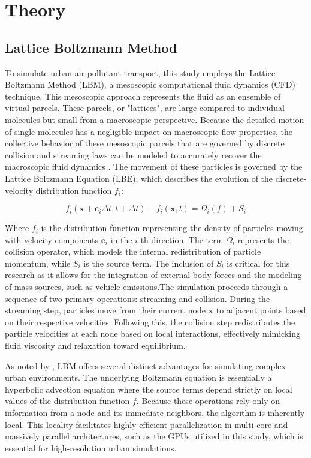 \section{Theory}

\subsection{Lattice Boltzmann Method}

To simulate urban air pollutant transport, this study employs the Lattice Boltzmann Method (LBM), a mesoscopic computational fluid dynamics (CFD) technique. This mesoscopic approach represents the fluid as an ensemble of virtual parcels. These parcels, or "lattices", are large compared to individual molecules but small from a macroscopic perspective. Because the detailed motion of single molecules has a negligible impact on macroscopic flow properties, the collective behavior of these mesoscopic parcels that are governed by discrete collision and streaming laws can be modeled to accurately recover the macroscopic fluid dynamics \parencite{Hu2025}. The movement of these particles is governed by the Lattice Boltzmann Equation (LBE), which describes the evolution of the discrete-velocity distribution function $f_i$:

\begin{equation}
    f_{i}(\mathbf{x} + \mathbf{c}_{i}\Delta t, t + \Delta t) - f_{i}(\mathbf{x}, t) = \Omega_i(f) + S_i    
\end{equation}

Where $f_i$ is the distribution function representing the density of particles moving with velocity components $\mathbf{c}_i$ in the $i$-th direction. The term $\Omega_i$ represents the collision operator, which models the internal redistribution of particle momentum, while $S_i$ is the source term. The inclusion of $S_i$ is critical for this research as it allows for the integration of external body forces and the modeling of mass sources, such as vehicle emissions.The simulation proceeds through a sequence of two primary operations: streaming and collision. During the streaming step, particles move from their current node $\mathbf{x}$ to adjacent points based on their respective velocities. Following this, the collision step redistributes the particle velocities at each node based on local interactions, effectively mimicking fluid viscosity and relaxation toward equilibrium. 

As noted by \textcite{Kruger2017LBM}, LBM offers several distinct advantages for simulating complex urban environments. The underlying Boltzmann equation is essentially a hyperbolic advection equation where the source terms depend strictly on local values of the distribution function $f$. Because these operations rely only on information from a node and its immediate neighbors, the algorithm is inherently local. This locality facilitates highly efficient parallelization in multi-core and massively parallel architectures, such as the GPUs utilized in this study, which is essential for high-resolution urban simulations.

